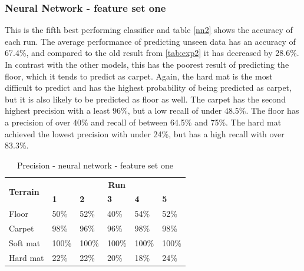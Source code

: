 \documentclass[USenglish]{ifimaster}  %
\begin{document}
\subsubsection{Neural Network - feature set one}
This is the fifth best performing classifier and table \ref{nn2} shows the accuracy of each run. The average performance of predicting unseen data has an accuracy of 67.4\%, and compared to the old result from \ref{tab:exp2} it has decreased by 28.6\%. In contrast with the other models, this has the poorest result of predicting the floor, which it tends to predict as carpet. Again, the hard mat is the most difficult to predict and has the highest probability of being predicted as carpet, but it is also likely to be predicted as floor as well. The carpet has the second highest precision with a least 96\%, but a low recall of under 48.5\%. The floor has a precision of over 40\% and recall of between 64.5\% and 75\%. The hard mat achieved the lowest precision with under 24\%, but has a high recall with over 83.3\%.
\begin{table}[h]
	\begin{subtable}[h]{1\textwidth}
		\centering
		\captionsetup{justification=centering}
		\begin{tabular}{@{}llllll@{}}
			\toprule
			\multirow{2}{*}{\textbf{Terrain}} & \multicolumn{5}{c}{\textbf{Run}} \\ \cmidrule(l){2-6} 
			& \multicolumn{1}{l|}{\textbf{1}} & \multicolumn{1}{l|}{\textbf{2}} & \multicolumn{1}{l|}{\textbf{3}} & \multicolumn{1}{l|}{\textbf{4}} & \textbf{5} \\ \midrule
			\multicolumn{1}{l|}{Floor} & \multicolumn{1}{l|}{50\%} & \multicolumn{1}{l|}{52\%} & \multicolumn{1}{l|}{40\%} & \multicolumn{1}{l|}{54\%} & 52\% \\ \midrule
			\multicolumn{1}{l|}{Carpet} & \multicolumn{1}{l|}{98\%} & \multicolumn{1}{l|}{96\%} & \multicolumn{1}{l|}{96\%} & \multicolumn{1}{l|}{98\%} & 98\% \\ \midrule
			\multicolumn{1}{l|}{Soft mat} & \multicolumn{1}{l|}{100\%} & \multicolumn{1}{l|}{100\%} & \multicolumn{1}{l|}{100\%} & \multicolumn{1}{l|}{100\%} & 100\% \\ \midrule
			\multicolumn{1}{l|}{Hard mat} & \multicolumn{1}{l|}{22\%} & \multicolumn{1}{l|}{22\%} & \multicolumn{1}{l|}{20\%} & \multicolumn{1}{l|}{18\%} & 24\% \\ \bottomrule
		\end{tabular}
		\caption{Precision - neural network - feature set one}
		\label{nnPrecision}
	\end{subtable}
\end{table}
\end{document}
